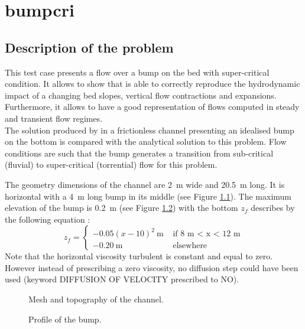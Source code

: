 \chapter{bumpcri}
%
\label{t2d:bumpcri:sect}
%
\section{Description of the problem}
\bigskip
This test case presents a flow over a bump on the bed 
with super-critical condition.
It allows to show that  is able to correctly 
reproduce the hydrodynamic impact of a changing bed slopes, 
vertical flow contractions and expansions. Furthermore, 
it allows to have a good representation of flows computed in 
steady and transient flow regimes. \\
The solution produced by  in a frictionless channel 
presenting an idealised bump on the bottom  is compared with the analytical 
solution to this problem.  Flow conditions are such that the bump 
generates a transition from sub-critical (fluvial) to super-critical 
(torrential) flow for this problem.

\bigskip
The geometry dimensions of the channel are 2~m wide and 
20.5~m long. It is horizontal with a 4~m long bump in 
its middle (see Figure \ref{t2d:bumpcri:fig:baty}). 
The maximum elevation of the bump is 0.2~m (see Figure \ref{t2d:bumpcri:fig:profil}) 
with the bottom $z_f$ describes by the following equation :
\begin{equation*}
z_f = \left\{
\begin{array}{rl}
  -0.05(x-10)^2~\text{m}& \text{ if 8 m < x < 12 m} \\
-0.20~\text{m} & \text{ elsewhere}
\end{array}
\right.
\end{equation*}
Note that the horizontal viscosity turbulent is constant and equal to zero. 
However instead of prescribing a zero viscosity, no diffusion step could 
have been used (keyword DIFFUSION OF VELOCITY prescribed to NO).
%
\begin{figure}[!htbp]
 \centering
 \caption{Mesh and topography of the channel.}
 \label{t2d:bumpcri:fig:baty}
\end{figure}
\begin{figure}[!htbp]
 \centering
 \caption{Profile of the bump.}
 \label{t2d:bumpcri:fig:profil}
\end{figure}
%
